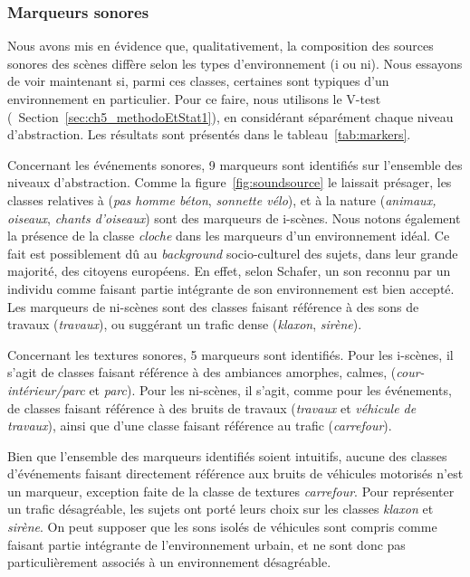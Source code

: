\subsubsection{Marqueurs sonores}
\label{sec:ch5_marqueurXp1}

Nous avons mis en évidence que, qualitativement, la composition des sources sonores des scènes diffère selon les types d'environnement (i ou ni). Nous essayons de voir maintenant si, parmi ces classes, certaines sont typiques d'un environnement en particulier. Pour ce faire, nous utilisons le V-test (\cf~Section~\ref{sec:ch5_methodoEtStat1}), en considérant séparément chaque niveau d'abstraction. Les résultats sont présentés dans le tableau~\ref{tab:markers}.

Concernant les événements sonores, 9 marqueurs sont identifiés sur l'ensemble des niveaux d'abstraction. Comme la figure~\ref{fig:soundsource} le laissait présager, les classes relatives à   (\emph{pas homme béton}, \emph{sonnette vélo}), et à la nature (\emph{animaux, oiseaux}, \emph{chants d'oiseaux}) sont des marqueurs de i-scènes. Nous notons également la présence de la classe \emph{cloche} dans les marqueurs d'un environnement idéal. Ce fait est possiblement dû au \emph{background} socio-culturel des sujets, dans leur grande majorité, des citoyens européens. En effet, selon Schafer, un son reconnu par un individu comme faisant partie intégrante de son environnement est bien accepté. Les marqueurs de ni-scènes sont des classes faisant référence à des sons de travaux (\emph{travaux}), ou suggérant un trafic dense (\emph{klaxon}, \emph{sirène}).

Concernant les textures sonores, 5 marqueurs sont identifiés. Pour les i-scènes, il s'agit de classes faisant référence à des ambiances amorphes, calmes, (\emph{cour-intérieur/parc} et \emph{parc}). Pour les ni-scènes, il s'agit, comme pour les événements, de classes faisant référence à des bruits de travaux (\emph{travaux} et \emph{véhicule de travaux}), ainsi que d'une classe faisant référence au trafic (\emph{carrefour}).

Bien que l'ensemble des marqueurs identifiés soient intuitifs, aucune des classes d'événements faisant directement référence aux bruits de véhicules motorisés n'est un marqueur, exception faite de la classe de textures \emph{carrefour}. Pour représenter un trafic désagréable, les sujets ont porté leurs choix sur les classes \emph{klaxon} et \emph{sirène}. On peut supposer que les sons isolés de véhicules sont compris comme faisant partie intégrante de l'environnement urbain, et ne sont donc pas particulièrement associés à un environnement désagréable. \\ 

